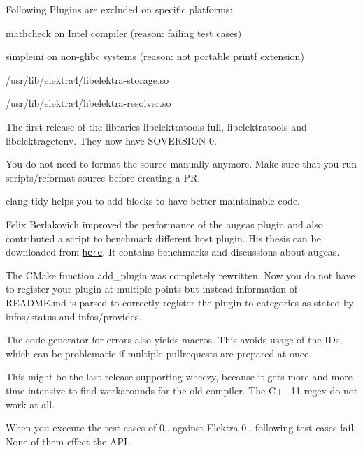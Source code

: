Following Plugins are excluded on specific platforms\+:


\begin{DoxyItemize}
\item mathcheck on Intel compiler (reason\+: failing test cases)
\item simpleini on non-\/glibc systems (reason\+: not portable printf extension)
\end{DoxyItemize}


\begin{DoxyItemize}
\item /usr/lib/elektra4/libelektra-\/storage.so
\item /usr/lib/elektra4/libelektra-\/resolver.so
\end{DoxyItemize}

The first release of the libraries libelektratools-\/full, libelektratools and libelektragetenv. They now have S\+O\+V\+E\+R\+S\+I\+ON 0.

You do not need to format the source manually anymore. Make sure that you run scripts/reformat-\/source before creating a PR.

{\ttfamily clang-\/tidy} helps you to add blocks to have better maintainable code.

Felix Berlakovich improved the performance of the augeas plugin and also contributed a script to benchmark different host plugin. His thesis can be downloaded from \href{https://www.libelektra.org/ftp/elektra/berlakovich2016universal.pdf}{\tt here}. It contains benchmarks and discussions about augeas.

The C\+Make function {\ttfamily add\+\_\+plugin} was completely rewritten. Now you do not have to register your plugin at multiple points but instead information of R\+E\+A\+D\+M\+E.\+md is parsed to correctly register the plugin to categories as stated by {\ttfamily infos/status} and {\ttfamily infos/provides}.

The code generator for errors also yields macros. This avoids usage of the I\+Ds, which can be problematic if multiple pullrequests are prepared at once.

This might be the last release supporting wheezy, because it gets more and more time-\/intensive to find workarounds for the old compiler. The C++11 regex do not work at all.

When you execute the test cases of 0.. against Elektra 0.. following test cases fail. None of them effect the A\+PI.


